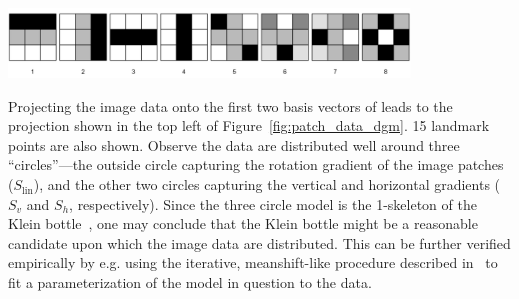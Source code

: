 \documentclass{article} %
\begin{document}
\begin{center}
	\includegraphics[width=0.80\textwidth]{dct_basis} 
\end{center}
\noindent Projecting the image data onto the first two basis vectors of leads to the projection shown in the top left of Figure~\ref{fig:patch_data_dgm}. 15 landmark points are also shown. Observe the data are distributed well around three ``circles''---the outside circle capturing the rotation gradient of the image patches ($S_{\mathrm{lin}}$), and the other two circles capturing the vertical and horizontal gradients ($S_v$ and $S_h$, respectively). Since the three circle model is the 1-skeleton of the Klein bottle~\cite{carlsson2008local}, one may conclude that the Klein bottle might be a reasonable candidate upon which the image data are distributed. This can be further verified empirically by e.g. using the iterative, meanshift-like procedure described in~\cite{carlsson2008local} to fit a parameterization of the model in question to the data. 
\end{document}
